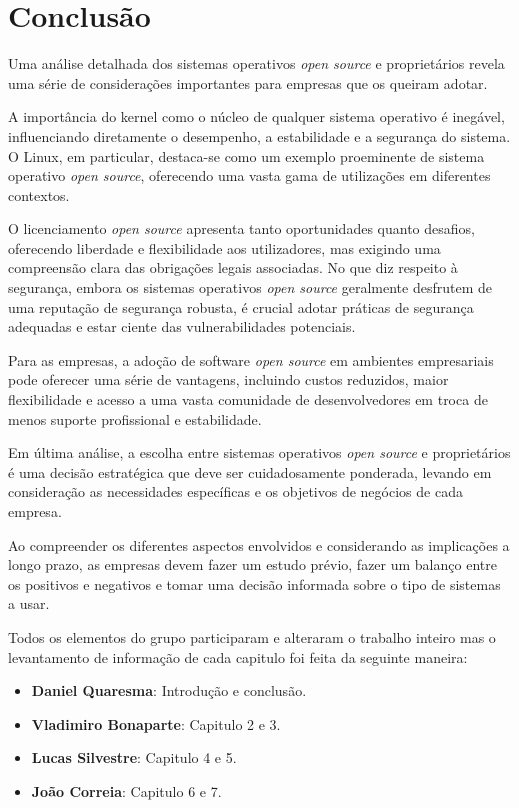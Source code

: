 \section{Conclusão} \label{section: introduction}
Uma análise detalhada dos sistemas operativos \textit{open source} e proprietários revela uma série de considerações importantes para empresas que os queiram adotar. 
\par \vspace{6pt}
A importância do kernel como o núcleo de qualquer sistema operativo é inegável, influenciando diretamente o desempenho, a estabilidade e a segurança do sistema. O Linux, em particular, destaca-se como um exemplo proeminente de sistema operativo \textit{open source}, oferecendo uma vasta gama de utilizações em diferentes contextos.
\par \vspace{6pt}
O licenciamento \textit{open source} apresenta tanto oportunidades quanto desafios, oferecendo liberdade e flexibilidade aos utilizadores, mas exigindo uma compreensão clara das obrigações legais associadas. No que diz respeito à segurança, embora os sistemas operativos \textit{open source} geralmente desfrutem de uma reputação de segurança robusta, é crucial adotar práticas de segurança adequadas e estar ciente das vulnerabilidades potenciais.
\par \vspace{6pt}
Para as empresas, a adoção de software \textit{open source} em ambientes empresariais pode oferecer uma série de vantagens, incluindo custos reduzidos, maior flexibilidade e acesso a uma vasta comunidade de desenvolvedores em troca de menos suporte profissional e estabilidade.
\par \vspace{6pt}
Em última análise, a escolha entre sistemas operativos \textit{open source} e proprietários é uma decisão estratégica que deve ser cuidadosamente ponderada, levando em consideração as necessidades específicas e os objetivos de negócios de cada empresa. 
\par \vspace{6pt}
Ao compreender os diferentes aspectos envolvidos e considerando as implicações a longo prazo, as empresas devem fazer um estudo prévio, fazer um balanço entre os positivos e negativos e tomar uma decisão informada sobre o tipo de sistemas a usar.
\par\vspace{12pt}

Todos os elementos do grupo participaram e alteraram o trabalho inteiro mas o levantamento de informação de cada capitulo foi feita da seguinte maneira:
\begin{itemize}
  \item \textbf{Daniel Quaresma}: Introdução e conclusão.
  \item \textbf{Vladimiro Bonaparte}: Capitulo 2 e 3.
  \item \textbf{Lucas Silvestre}: Capitulo 4 e 5.
  \item \textbf{João Correia}: Capitulo 6 e 7.
\end{itemize}
